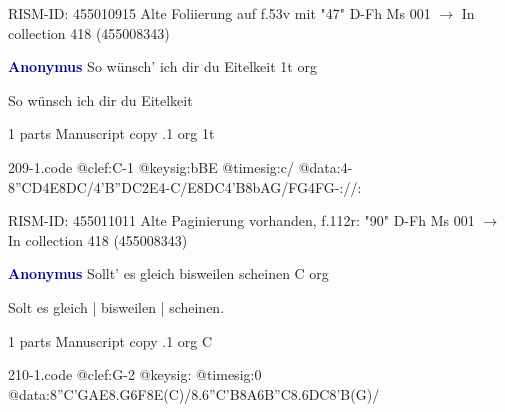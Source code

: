 \documentclass[twocolumn]{book}
\begin{document}
\newline RISM-ID: 455010915
\newline Alte Foliierung auf f.53v mit "47"
\newline D-Fh  Ms 001
\newline $\rightarrow$ In collection 418 (455008343)

\newline \par \vspace{7pt} \textcolor{darkblue}{\textbf{Anonymus  }}
\newline So wünsch' ich dir du Eitelkeit  1t  
\newline org
\newline \begin{itshape}[f.112r, heading:] So wünsch ich dir du Eitelkeit\end{itshape} 
\newline \textcolor{darkblue}{}  1 parts  
\newline Manuscript copy
.1  org  1t  
\begin{filecontents*}{209-1.code}
@clef:C-1
@keysig:bBE
@timesig:c/
@data:4-{8''CD}4E{8DC}/4'B''DC2E4-C/E{8DC}4'B{8bAG}/{FG}4FG-://:
\end{filecontents*}
\newline
%

\newline RISM-ID: 455011011
\newline Alte Paginierung vorhanden, f.112r: "90"
\newline D-Fh  Ms 001
\newline $\rightarrow$ In collection 418 (455008343)

\newline \par \vspace{7pt} \textcolor{darkblue}{\textbf{Anonymus  }}
\newline Sollt' es gleich bisweilen scheinen  C  
\newline org
\newline \begin{itshape}[f.33v, at left:] Solt es gleich | bisweilen | scheinen.\end{itshape} 
\newline \textcolor{darkblue}{}  1 parts  
\newline Manuscript copy
.1  org  C  
\begin{filecontents*}{210-1.code}
@clef:G-2
@keysig:
@timesig:0
@data:{8''C'GAE}{8.G6F8E(C)}/{8.6''C'B8A6B''C}{8.6DC8'B(G)}/
\end{filecontents*}
\newline
%
\end{document}
